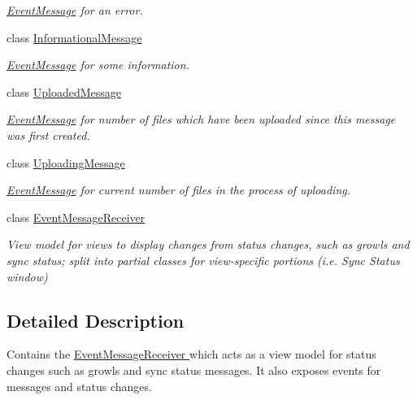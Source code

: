 \begin{DoxyCompactItemize}
\begin{DoxyCompactList}\small\item\em \hyperlink{class_cloud_api_public_1_1_event_message_receiver_1_1_event_message}{Event\-Message} for an error. \end{DoxyCompactList}\item 
class \hyperlink{class_cloud_api_public_1_1_event_message_receiver_1_1_informational_message}{Informational\-Message}
\begin{DoxyCompactList}\small\item\em \hyperlink{class_cloud_api_public_1_1_event_message_receiver_1_1_event_message}{Event\-Message} for some information. \end{DoxyCompactList}\item 
class \hyperlink{class_cloud_api_public_1_1_event_message_receiver_1_1_uploaded_message}{Uploaded\-Message}
\begin{DoxyCompactList}\small\item\em \hyperlink{class_cloud_api_public_1_1_event_message_receiver_1_1_event_message}{Event\-Message} for number of files which have been uploaded since this message was first created. \end{DoxyCompactList}\item 
class \hyperlink{class_cloud_api_public_1_1_event_message_receiver_1_1_uploading_message}{Uploading\-Message}
\begin{DoxyCompactList}\small\item\em \hyperlink{class_cloud_api_public_1_1_event_message_receiver_1_1_event_message}{Event\-Message} for current number of files in the process of uploading. \end{DoxyCompactList}\item 
class \hyperlink{class_cloud_api_public_1_1_event_message_receiver_1_1_event_message_receiver}{Event\-Message\-Receiver}
\begin{DoxyCompactList}\small\item\em View model for views to display changes from status changes, such as growls and sync status; split into partial classes for view-\/specific portions (i.\-e. Sync Status window) \end{DoxyCompactList}\end{DoxyCompactItemize}


\subsection{Detailed Description}
Contains the \hyperlink{class_cloud_api_public_1_1_event_message_receiver_1_1_event_message_receiver}{Event\-Message\-Receiver } which acts as a view model for status changes such as growls and sync status messages. It also exposes events for messages and status changes. 